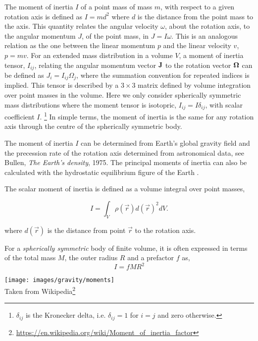 
The moment of inertia $I$ of a point mass of mass $m$,
with respect to a given rotation axis is defined as $I = m d^2$
where $d$ is the distance from the point mass to the axis.
This quantity relates the angular velocity $\omega$, 
about the rotation axis,
to the angular momentum $J$, of the point mass, in $J = I \omega$.
This is an analogous relation as the one between the linear momentum $p$
and the linear velocity $v$, $p = m v$. 
For an extended mass distribution in a volume $V$,
a moment of inertia tensor, $I_{ij}$,
relating the angular momentum vector ${\bf J}$ to the rotation vector ${\bf \Omega}$
can be defined as $J_i = I_{ij} \Omega_j$, where the summation convention for repeated
indices is implied.
This tensor is described by a $3 \times 3$ matrix defined by volume integration
over point masses in the volume.
Here we only consider spherically symmetric mass distributions where
the moment tensor is isotopric, $I_{ij} = I \delta_{ij}$,
with scalar coefficient $I$.
\footnote{
$\delta_{ij}$ is the Kronecker delta, i.e. $\delta_{ij}=1$ for
$i=j$ and zero otherwise. }
In simple terms, the moment of inertia is the same for any rotation axis
through the centre of the spherically symmetric body.

The moment of inertia $I$ can be determined from Earth's global gravity
field and the precession rate of the rotation axis determined 
from astronomical data, see Bullen, {\it The Earth's density}, 1975.
The principal moments of inertia can also be calculated with the hydrostatic
equilibrium figure of the Earth \cite{lihz17}.


The scalar moment of inertia is defined as
a volume integral over point masses,
\begin{mdframed}[backgroundcolor=blue!5]
\begin{equation}
I = \int_V \rho(\vec{r}) d(\vec r)^2 dV. \label{eq:momI}
\end{equation}
\end{mdframed}
where $d(\vec r)$ is the distance from point $\vec{r}$ to the rotation axis.

For a {\it spherically symmetric} body of finite volume, 
it is often expressed in terms of the total mass $M$, the outer radius $R$ 
and a prefactor $f$ as,
\begin{equation}
\boxed{    I = f M R^2}
\label{def_momint_prefact}
\end{equation}

\begin{center}
\texttt{[image: images/gravity/moments]}\\
{\captionfont Taken from Wikipedia\footnote{\url{https://en.wikipedia.org/wiki/Moment_of_inertia_factor}}}
\end{center}

